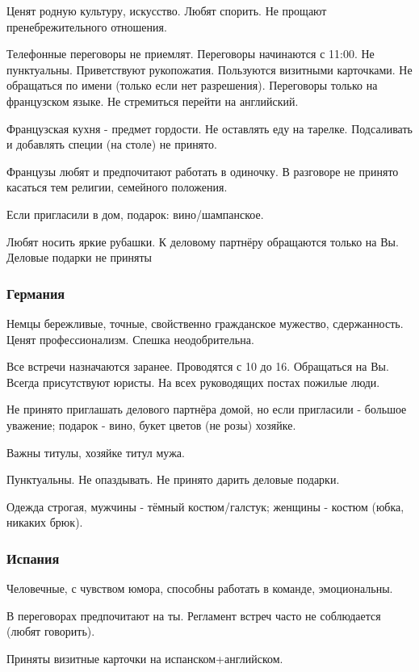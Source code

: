 \documentclass{article}
\begin{document}
Ценят родную культуру, искусство. Любят спорить. Не прощают пренебрежительного отношения.

Телефонные переговоры не приемлят. Переговоры начинаются с 11:00. Не пунктуальны. Приветствуют рукопожатия. Пользуются визитными карточками. Не обращаться по имени (только если нет разрешения). Переговоры только на французском языке. Не стремиться перейти на английский.

Французская кухня - предмет гордости. Не оставлять еду на тарелке.
Подсаливать и добавлять специи (на столе) не принято.

Французы любят и предпочитают работать в одиночку. В разговоре не
принято касаться тем религии, семейного положения.

Если пригласили в дом, подарок: вино/шампанское.

Любят носить яркие рубашки. К деловому партнёру обращаются только
на Вы. Деловые подарки не приняты

\subsubsection{Германия}

Немцы бережливые, точные, свойственно гражданское мужество, сдержанность. Ценят профессионализм. Спешка неодобрительна.

Все встречи назначаются заранее. Проводятся с 10 до 16. Обращаться на Вы. Всегда присутствуют юристы. На всех руководящих постах пожилые люди.

Не принято приглашать делового партнёра домой, но если пригласили - большое уважение; подарок - вино, букет цветов (не розы) хозяйке.

Важны титулы, хозяйке титул мужа.

Пунктуальны. Не опаздывать. Не принято дарить деловые подарки.

Одежда строгая, мужчины - тёмный костюм/галстук; женщины - костюм (юбка, никаких брюк).

\subsubsection{Испания}

Человечные, с чувством юмора, способны работать в команде, эмоциональны.

В переговорах предпочитают на ты. Регламент встреч часто не соблюдается (любят говорить).

Приняты визитные карточки на испанском+английском.
\end{document}
